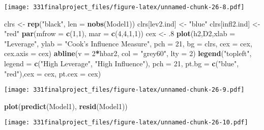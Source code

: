 \documentclass[]{article}
\newenvironment{Shaded}{\begin{snugshade}}{\end{snugshade}}
\newcommand{\KeywordTok}[1]{\textcolor[rgb]{0.13,0.29,0.53}{\textbf{#1}}}
\newcommand{\DataTypeTok}[1]{\textcolor[rgb]{0.13,0.29,0.53}{#1}}
\newcommand{\DecValTok}[1]{\textcolor[rgb]{0.00,0.00,0.81}{#1}}
\newcommand{\StringTok}[1]{\textcolor[rgb]{0.31,0.60,0.02}{#1}}
\newcommand{\OperatorTok}[1]{\textcolor[rgb]{0.81,0.36,0.00}{\textbf{#1}}}
\newcommand{\NormalTok}[1]{#1}
\begin{document}
\texttt{[image: 331finalproject\_files/figure-latex/unnamed-chunk-26-8.pdf]}

\begin{Shaded}
\begin{Highlighting}[]
\NormalTok{clrs <-}\StringTok{ }\KeywordTok{rep}\NormalTok{(}\StringTok{"black"}\NormalTok{, }\DataTypeTok{len =} \KeywordTok{nobs}\NormalTok{(Model1))}
\NormalTok{clrs[lev2.ind] <-}\StringTok{ "blue"}
\NormalTok{clrs[infl2.ind] <-}\StringTok{"red"}
\KeywordTok{par}\NormalTok{(}\DataTypeTok{mfrow =} \KeywordTok{c}\NormalTok{(}\DecValTok{1}\NormalTok{,}\DecValTok{1}\NormalTok{), }\DataTypeTok{mar =} \KeywordTok{c}\NormalTok{(}\DecValTok{4}\NormalTok{,}\DecValTok{4}\NormalTok{,}\DecValTok{1}\NormalTok{,}\DecValTok{1}\NormalTok{))}
\NormalTok{cex <-}\StringTok{ }\NormalTok{.}\DecValTok{8}
\KeywordTok{plot}\NormalTok{(h2,D2,}\DataTypeTok{xlab =} \StringTok{"Leverage"}\NormalTok{, }\DataTypeTok{ylab =} \StringTok{"Cook's Influence Measure"}\NormalTok{, }\DataTypeTok{pch =} \DecValTok{21}\NormalTok{, }\DataTypeTok{bg =}\NormalTok{ clrs, }\DataTypeTok{cex =}\NormalTok{ cex, }\DataTypeTok{cex.axis =}\NormalTok{ cex)}
\KeywordTok{abline}\NormalTok{(}\DataTypeTok{v =} \DecValTok{2}\OperatorTok{*}\NormalTok{hbar2, }\DataTypeTok{col =} \StringTok{"grey60"}\NormalTok{, }\DataTypeTok{lty =} \DecValTok{2}\NormalTok{)}
\KeywordTok{legend}\NormalTok{(}\StringTok{"topleft"}\NormalTok{, }\DataTypeTok{legend =} \KeywordTok{c}\NormalTok{(}\StringTok{"High Leverage"}\NormalTok{, }\StringTok{"High Influence"}\NormalTok{), }\DataTypeTok{pch =} \DecValTok{21}\NormalTok{, }\DataTypeTok{pt.bg =} \KeywordTok{c}\NormalTok{(}\StringTok{"blue"}\NormalTok{, }\StringTok{"red"}\NormalTok{),}\DataTypeTok{cex =}\NormalTok{ cex, }\DataTypeTok{pt.cex =}\NormalTok{ cex)}
\end{Highlighting}
\end{Shaded}

\texttt{[image: 331finalproject\_files/figure-latex/unnamed-chunk-26-9.pdf]}

\begin{Shaded}
\begin{Highlighting}[]
\KeywordTok{plot}\NormalTok{(}\KeywordTok{predict}\NormalTok{(Model1), }\KeywordTok{resid}\NormalTok{(Model1))}
\end{Highlighting}
\end{Shaded}

\texttt{[image: 331finalproject\_files/figure-latex/unnamed-chunk-26-10.pdf]}
\end{document}
